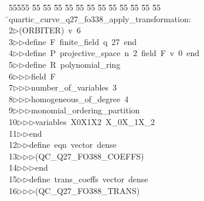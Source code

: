 %
%
\begin{tabbing}
55555 \= 55 \= 55 \= 55 \= 55 \= 55 \= 55 \= 55 \= 55 \= 55 \= 55 \= 55 \= 55 \= \>quartic\_curve\_q27\_fo338\_apply\_transformation:\\[0pt]
2\>$\triangleright$\>(ORBITER)\ v\ 6\ \\[0pt]
3\>$\triangleright$\>$\triangleright$\>define\ F\ finite\_field\ q\ 27\ end\ \\[0pt]
4\>$\triangleright$\>$\triangleright$\>define\ P\ projective\_space\ n\ 2\ field\ F\ v\ 0\ end\ \\[0pt]
5\>$\triangleright$\>$\triangleright$\>define\ R\ polynomial\_ring\ \\[0pt]
6\>$\triangleright$\>$\triangleright$\>$\triangleright$\>field\ F\ \\[0pt]
7\>$\triangleright$\>$\triangleright$\>$\triangleright$\>number\_of\_variables\ 3\ \\[0pt]
8\>$\triangleright$\>$\triangleright$\>$\triangleright$\>homogeneous\_of\_degree\ 4\ \\[0pt]
9\>$\triangleright$\>$\triangleright$\>$\triangleright$\>monomial\_ordering\_partition\ \\[0pt]
10\>$\triangleright$\>$\triangleright$\>$\triangleright$\>variables\ X0X1X2\ X\_0X\_1X\_2\ \\[0pt]
11\>$\triangleright$\>$\triangleright$\>end\ \\[0pt]
12\>$\triangleright$\>$\triangleright$\>define\ eqn\ vector\ dense\ \\[0pt]
13\>$\triangleright$\>$\triangleright$\>$\triangleright$\>(QC\_Q27\_FO388\_COEFFS)\ \\[0pt]
14\>$\triangleright$\>$\triangleright$\>$\triangleright$\>end\ \\[0pt]
15\>$\triangleright$\>$\triangleright$\>define\ trans\_coeffs\ vector\ dense\ \\[0pt]
16\>$\triangleright$\>$\triangleright$\>$\triangleright$\>(QC\_Q27\_FO388\_TRANS)\ \\[0pt]

\end{tabbing}
